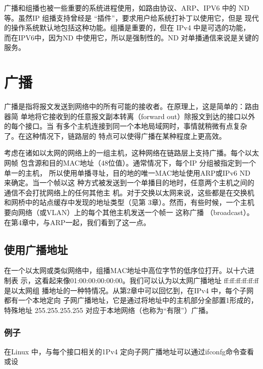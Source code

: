 \begin{tcolorbox}
    广播和组播也被一些重要的系统进程使用，如路由协议、ARP、IPV6 中的
ND 等。虽然IP 组播支持曾经是 “插件”，要求用户给系统打补丁以使用它，但是
现代的操作系统默认地包括这种功能。组播是重要的，但在 IPv4 中是可选的功能，
而在IPV6中，因为ND 中使用它，所以是强制性的。ND 对单播通信来说是关键的
服务。
\end{tcolorbox}

\section{广播}
广播是指将报文发送到网络中的所有可能的接收者。在原理上，这是简单的：路由器简
单地将它接收到的任意报文副本转离（forward out）除报文到达的接口以外的每个接口。当
有多个主机连接到同一个本地局域网时，事情就稍微有点复杂了。在这种情况下，链路层的
特点可以使得广播在某种程度上更高效。

考虑在诸如以太网的网络上的一组主机，这种网络在链路层上支持广播。每个以太网帧
包含源和目的MAC地址（48位值）。通常情况下，每个IP 分组被指定到一个单一的主机，
所以使用单播寻址，目的地的唯一MAC地址使用ARP或IPv6 ND 来确定。当一个帧以这
种方式被发送到一个单播目的地时，任意两个主机之间的通信不会打扰网络上的任何其他主
机。对于交换以太网来说，这些都是在交换机和网桥中的站点缓存中发现的地址类型（见第
3章）。然而，有些时候，一个主机要向网络（或VLAN）上的每个其他主机发送一个帧一
这称广播 （broadcast）。在第4章中，与ARP一起，我们看到了这一点。

\subsection{使用广播地址}
在一个以太网或类似网络中，组播MAC地址中高位字节的低序位打开。以十六进制表
示，这看起来像01:00:00:00:00:00。我们可以认为以太网广播地址 ff:ff:ff:ff:ff:ff 是以太网组
播地址的一种特情况。从第2章中可以回忆到，在IPv4 中，每个子网都有一个本地定向
子网广播地址，它是通过将地址中的主机部分全部置1形成的，特殊地址 255.255.255.255
对应于本地网络（也称为“有限”）广播。

\subsubsection{例子}
在Linux 中，与每个接口相关的1Pv4 定向子网广播地址可以通过ifconfg命令查看或设

